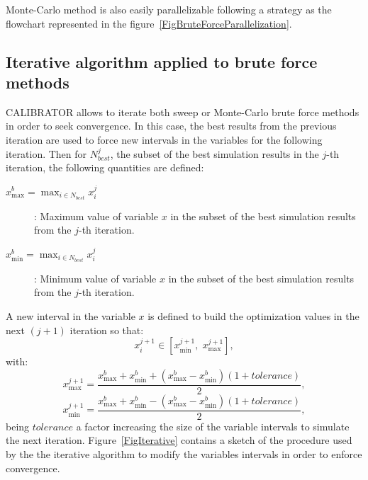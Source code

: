 \documentclass[review,authoryear]{elsarticle}
\newcommand{\EQ}[2]
{\begin{equation}#1\label{#2}\end{equation}}
\begin{document}
Monte-Carlo method is also easily parallelizable following a strategy as the
flowchart represented in the figure~\ref{FigBruteForceParallelization}.

\subsection{Iterative algorithm applied to brute force methods}

CALIBRATOR allows to iterate both sweep or Monte-Carlo brute force methods in
order to seek convergence. In this case, the best results from the previous
iteration are used to force new intervals in the variables for the following
iteration. Then for $N_{best}^j$, the subset of the best simulation results in
the $j$-th iteration, the following quantities are defined:
\begin{description}
\item[$\displaystyle x_{\max}^b=\max_{i\in N_{best}}x_i^j$]: Maximum value of
	variable $x$ in the subset of the best simulation results from the $j$-th
	iteration.
\item[$\displaystyle x_{\min}^b=\max_{i\in N_{best}}x_i^j$]: Minimum value of
	variable $x$ in the subset of the best simulation results from the $j$-th
	iteration.
\end{description}
A new interval in the variable $x$ is defined to build the optimization values in the next $(j+1)$ iteration so that:
\EQ{x_i^{j+1}\in\left[x_{\min}^{j+1},\;x_{\max}^{j+1}\right],}
{EqIterationInterval}
with:
\[
	x_{\max}^{j+1}=\frac{x_{\max}^b+x_{\min}^b
		+\left(x_{\max}^b-x_{\min}^b\right)(1+tolerance)}{2},
\]
\[
	x_{\min}^{j+1}=\frac{x_{\max}^b+x_{\min}^b
		-\left(x_{\max}^b-x_{\min}^b\right)(1+tolerance)}{2},
\]
being $tolerance$ a factor increasing the size of the variable intervals to
simulate the next iteration.
Figure~\ref{FigIterative} contains a sketch of the procedure used by the the iterative algorithm to modify the variables intervals in order to enforce convergence. 
\end{document}
